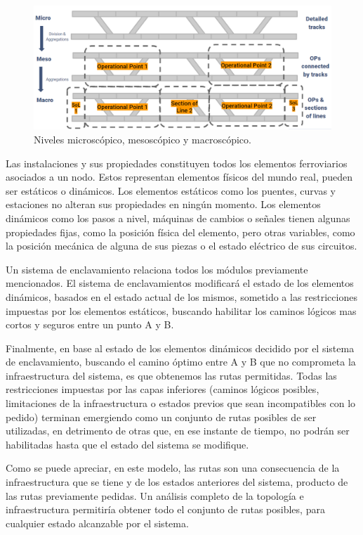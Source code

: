     \begin{figure}[!h]
        \centering
        \includegraphics[width=1\textwidth]{Figuras/railtopomodel}
        \centering\caption{Niveles microscópico, mesoscópico y macroscópico.}
        \label{fig:RTM_2}
    \end{figure}
    
    Las instalaciones y sus propiedades constituyen todos los elementos ferroviarios asociados a un nodo. Estos representan elementos físicos del mundo real, pueden ser estáticos o dinámicos. Los elementos estáticos como los puentes, curvas y estaciones no alteran sus propiedades en ningún momento. Los elementos dinámicos como los pasos a nivel, máquinas de cambios o señales tienen algunas propiedades fijas, como la posición física del elemento, pero otras variables, como la posición mecánica de alguna de sus piezas o el estado eléctrico de sus circuitos.

    Un sistema de enclavamiento relaciona todos los módulos previamente mencionados. El sistema de enclavamientos modificará el estado de los elementos dinámicos, basados en el estado actual de los mismos, sometido a las restricciones impuestas por los elementos estáticos, buscando habilitar los caminos lógicos mas cortos y seguros entre un punto A y B.

    Finalmente, en base al estado de los elementos dinámicos decidido por el sistema de enclavamiento, buscando el camino óptimo entre A y B que no comprometa la infraestructura del sistema, es que obtenemos las rutas permitidas. Todas las restricciones impuestas por las capas inferiores (caminos lógicos posibles, limitaciones de la infraestructura o estados previos que sean incompatibles con lo pedido) terminan emergiendo como un conjunto de rutas posibles de ser utilizadas, en detrimento de otras que, en ese instante de tiempo, no podrán ser habilitadas hasta que el estado del sistema se modifique.

    Como se puede apreciar, en este modelo, las rutas son una consecuencia de la infraestructura que se tiene y de los estados anteriores del sistema, producto de las rutas previamente pedidas. Un análisis completo de la topología e infraestructura permitiría obtener todo el conjunto de rutas posibles, para cualquier estado alcanzable por el sistema.